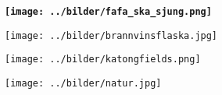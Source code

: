 %

\begin{intersong}
\sffamily\bfseries\LARGE{}
\texttt{[image: ../bilder/fafa\_ska\_sjung.png]} 
\end{intersong}
\sclearpage

\sclearpage

\begin{intersong}
\begin{center}
\texttt{[image: ../bilder/brannvinsflaska.jpg]} 
\end{center}
\end{intersong}
\sclearpage

\sclearpage

\sclearpage

\begin{intersong}[!h]
\begin{center}
\texttt{[image: ../bilder/katongfields.png]} 
\end{center}
\end{intersong}
\sclearpage

\begin{intersong}
\begin{center}
\texttt{[image: ../bilder/natur.jpg]} 
\end{center}
\end{intersong}
\sclearpage

\sclearpage

